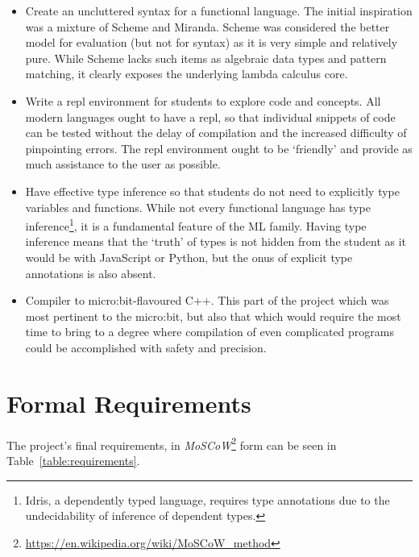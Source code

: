 \documentclass[12pt, a4paper]{report}
\begin{document}
\begin{itemize}
    \item Create an uncluttered syntax for a functional language. The initial inspiration was a
        mixture of Scheme and Miranda. Scheme was considered the better model for evaluation (but
        not for syntax) as it is very simple and relatively pure. While Scheme lacks such items as algebraic data types
        and pattern matching, it clearly exposes the underlying lambda calculus core.
    \item Write a repl environment for students to explore code and concepts. All modern languages
        ought to have a repl, so that individual snippets of code can be tested without the delay of
        compilation and the increased difficulty of pinpointing errors. The repl environment ought
        to be `friendly' and provide as much assistance to the user as possible. 
    \item Have effective type inference so that students do not need to explicitly type variables
        and functions. While not every functional language has type inference\footnote{Idris, a
        dependently typed language, requires type annotations due to the undecidability of inference of
        dependent types.}, it is a fundamental feature of the ML family. Having type inference means
        that the `truth' of types is not hidden from the student as it would be with JavaScript or
        Python, but the onus of explicit type annotations is also absent.
    \item Compiler to micro:bit-flavoured C++. This part of the project which was most
        pertinent to the micro:bit, but also that which would require the most time to bring to a
        degree where compilation of even complicated programs could be accomplished with safety and
        precision. 
\end{itemize}

\section{Formal Requirements}
\label{formalreq}
The project's final requirements, in
\textit{MoSCoW}\footnote{\url{https://en.wikipedia.org/wiki/MoSCoW_method}} form can be seen in
Table~\ref{table:requirements}.
\end{document}
